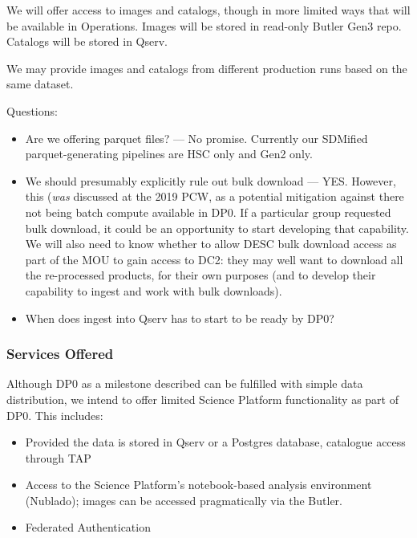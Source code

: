 We will offer access to images and catalogs, though in more limited ways that will be available in Operations.
Images will be stored in read-only Butler Gen3 repo.
Catalogs will be stored in Qserv.

We may provide images and catalogs from different production runs based on the same dataset.

Questions:

\begin{itemize}

\item Are we offering parquet files? --- No promise. Currently our SDMified parquet-generating pipelines are HSC only and Gen2 only.

\item We should presumably explicitly rule out bulk download  --- YES. However, this ({\it was} discussed at the 2019 PCW, as a potential mitigation against there not being batch compute available in DP0. If a particular group requested bulk download, it could be an opportunity to start developing that capability. We will also need to know whether to allow DESC bulk download access as part of the MOU to gain access to DC2: they may well want to download all the re-processed products, for their own purposes (and to develop their capability to ingest and work with bulk downloads).

\item When does ingest into Qserv has to start to be ready by DP0?

\end{itemize}

\subsubsection{Services Offered}

Although DP0 as a milestone described  can be fulfilled with simple data distribution, we intend to offer limited Science Platform functionality as part of DP0. This includes:

\begin{itemize}

\item Provided the data is stored in Qserv or a Postgres database, catalogue access through TAP

\item Access to the Science Platform's notebook-based analysis environment (Nublado); images can be accessed pragmatically via the Butler.

\item Federated Authentication

\end{itemize}

